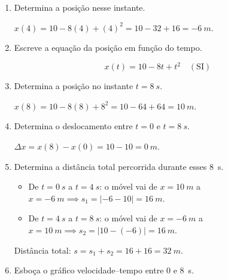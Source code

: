 \documentclass[11pt,a4paper]{article}
\begin{document}
\begin{enumerate}[label=\textbf{\arabic*.},resume]
		\item Determina a posição nesse instante.
		
		\begin{solucao}
			$x(4) = 10 - 8(4) + (4)^2 = 10 - 32 + 16 = \SI{-6}{m}$.
		\end{solucao}
		
		\item Escreve a equação da posição em função do tempo.
		
		\begin{solucao}
			\[
			x(t) = 10 - 8t + t^2 \quad (\text{SI})
			\]
		\end{solucao}
		
		\item Determina a posição no instante $t=\SI{8}{s}$.
		
		\begin{solucao}
			$x(8) = 10 - 8(8) + 8^2 = 10 - 64 + 64 = \SI{10}{m}$.
		\end{solucao}
		
		\item Determina o deslocamento entre $t=0$ e $t=\SI{8}{s}$.
		
		\begin{solucao}
			$\Delta x = x(8) - x(0) = 10 - 10 = \SI{0}{m}$.
		\end{solucao}
		
		\item Determina a distância total percorrida durante esses \SI{8}{s}.
		
		\begin{solucao}
			\begin{itemize}
				\item De $t = \SI{0}{s}$ a $t = \SI{4}{s}$: o móvel vai de $x = \SI{10}{m}$ a $x = \SI{-6}{m} \implies s_1 = |-6 - 10| = \SI{16}{m}$.
				\item De $t = \SI{4}{s}$ a $t = \SI{8}{s}$: o móvel vai de $x = \SI{-6}{m}$ a $x = \SI{10}{m} \implies s_2 = |10 - (-6)| = \SI{16}{m}$.
			\end{itemize}
			Distância total: $s = s_1 + s_2 = 16 + 16 = \SI{32}{m}$.
		\end{solucao}
		
		\item Esboça o gráfico velocidade--tempo entre $0$ e \SI{8}{s}.
		
		\begin{solucao}
			\begin{center}
			\end{center}
		\end{solucao}
		

\end{enumerate}
\end{document}
